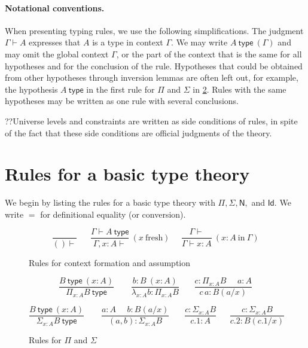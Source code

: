 \documentclass[11pt,a4paper]{article}
\theoremstyle{definition}
\newcommand{\conv}{=}
\newcommand{\Id}{\mathsf{Id}}
\newcommand{\type}{\mathsf{type}}
\newcommand{\mypi}[3]{\Pi_{#1:#2}#3}
\newcommand{\mylam}[3]{\lambda_{#1:#2}#3}
\newcommand{\app}[2]{{#1\,#2}} %
\newcommand{\mysig}[3]{\Sigma_{#1:#2}#3}
\newcommand{\N}{\mathsf{N}}
\begin{document}
\paragraph{Notational conventions.}
When presenting typing rules, we use the following simplifications.
The judgment $\Gamma\vdash A$ expresses that $A$ is a type in context $\Gamma$.
We may write $A~\type~(\Gamma)$ and may omit the global context $\Gamma$,
or the part of the context that is the same for all hypotheses and for the
conclusion of the rule.
Hypotheses that could be obtained from other
hypotheses through inversion lemmas are often left out,
for example, the hypothesis $A~\type$ in the first rule for $\Pi$ and $\Sigma$
in \cref{fig:PiSig}.
Rules with the same hypotheses may be written as one rule with several conclusions.

??Universe levels and constraints are written as side conditions of rules,
in spite of the fact that these side conditions are official judgments of the theory.


\section{Rules for a basic type theory}

We begin by listing the rules for a basic type theory
with $\Pi, \Sigma, \N,$ and $\Id$.
We write $\conv$ for definitional equality (or conversion).


\begin{figure}[h]
  \caption{Rules for context formation and assumption}\label{fig:context}
$$
\frac{}{()\vdash}~~~~~~~
\frac{\Gamma\vdash A~\type}{\Gamma,x:A\vdash}~(x~\text{fresh})~~~~~~
\frac{\Gamma\vdash}{\Gamma\vdash x:A}~(x\!:\! A~\text{in}~\Gamma)
$$
\end{figure}

\begin{figure}[h]
  \caption{Rules for $\Pi$ and $\Sigma$}\label{fig:PiSig}
$$
\frac{B~\type~(x:A)}{\mypi{x}{A}{B}~\type}~~~~~~~~~
\frac{b:B~(x:A)}{\mylam{x}{A}{b}:\mypi{x}{A}{B}}~~~~~~~~
\frac{c:\mypi{x}{A}{B}~~~~~~a:A}
     {\app{c}{a}:B(a/x)}
$$

$$
\frac{B~\type~(x:A)}{\mysig{x}{A}{B}~\type}~~~~~~~~~
\frac{a:A~~~~~~b:B(a/x)}{(a,b):\mysig{x}{A}{B}}~~~~~~~~
\frac{c:\mysig{x}{A}{B}}{c.1:A}~~~~~~~
\frac{c:\mysig{x}{A}{B}}{c.2:B(c.1/x)}
$$
\end{figure}
\end{document}
